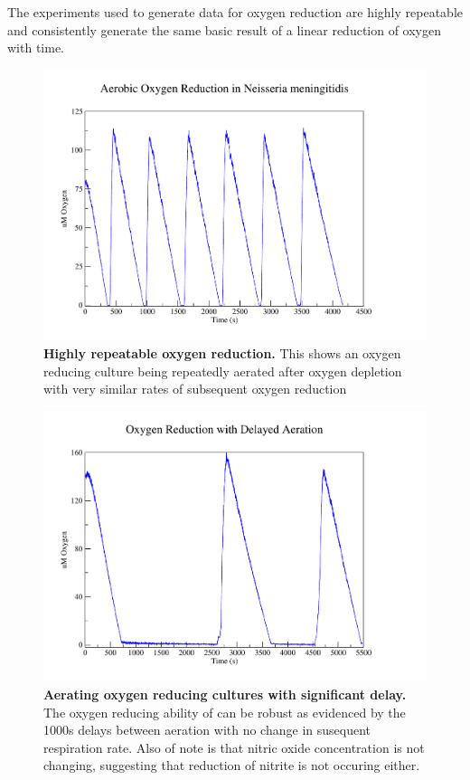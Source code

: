 The experiments used to generate data for oxygen reduction are highly repeatable and consistently generate the same basic result of a linear reduction of oxygen with time.
\begin{figure}[tbp]
 \centering
 \includegraphics[width=14cm, trim=75px 50px 125px 25px]{./05-oxygenreduction/data/repeatable_o2.pdf}
 \caption[Highly repeatable oxygen reduction]{{\bf Highly repeatable oxygen reduction.} This shows an oxygen reducing culture being repeatedly aerated after oxygen depletion with very similar rates of subsequent oxygen reduction
 \label{fig:oxy_repeatable_chl}}
\end{figure}


\begin{figure}[tbp]
 \centering
 \includegraphics[width=14cm, trim=75px 50px 125px 25px]{./05-oxygenreduction/data/o2_delay.pdf}
 \caption[Aerating oxygen reducing cultures with significant delay]{{\bf Aerating oxygen reducing cultures with significant delay.} The oxygen reducing ability of \Nm{} can be robust as evidenced by the 1000s delays between aeration with no change in susequent respiration rate. Also of note is that nitric oxide concentration is not changing, suggesting that reduction of nitrite is not occuring either.
 \label{fig:repeat_oxy_with_delay}}
\end{figure}


